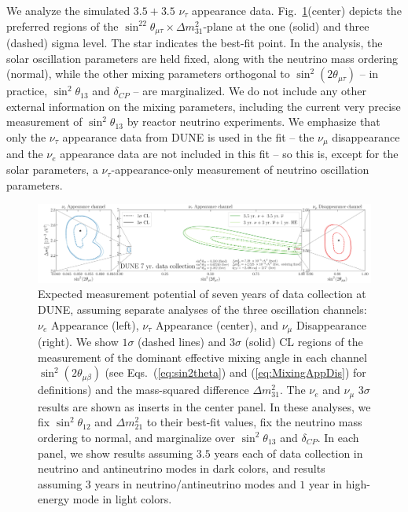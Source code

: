 \documentclass[aps,prd,onecolumn,nofootinbib,superscriptaddress, 11pt]{revtex4}
\begin{document}
We analyze the simulated $3.5+3.5$ $\nu_{\tau}$ appearance data. Fig.~\ref{fig:two_param}(center) depicts the preferred regions of the  $\sin^22\theta_{\mu\tau}\times \Delta m^2_{31}$-plane at the one (solid) and three (dashed) sigma level. The star indicates the best-fit point. In the analysis, the solar oscillation parameters are held fixed, along with the neutrino mass ordering (normal), while the other mixing parameters orthogonal to $\sin^2(2\theta_{\mu\tau})$ -- in practice, $\sin^2\theta_{13}$ and $\delta_{CP}$ -- are marginalized. We do not include any other external information on the mixing parameters, including the current very precise measurement of $\sin^2\theta_{13}$ by reactor neutrino experiments. We emphasize that only the $\nu_{\tau}$ appearance data from DUNE is used in the fit -- the $\nu_{\mu}$ disappearance and the $\nu_e$ appearance data are not included in this fit -- so this is, except for the solar parameters, a $\nu_\tau$-appearance-only measurement of neutrino oscillation parameters. 
\begin{figure}[ht]
\centerline{
\includegraphics[width=1\textwidth]{EffectiveAngle_Measurements.pdf}}
\caption{Expected measurement potential of seven years of data collection at DUNE, assuming separate analyses of the three oscillation channels: $\nu_e$ Appearance (left), $\nu_\tau$ Appearance (center), and $\nu_\mu$ Disappearance (right). We show $1\sigma$ (dashed lines) and $3\sigma$ (solid) CL regions of the measurement of the dominant effective mixing angle in each channel $\sin^2 (2\theta_{\mu \beta})$ (see Eqs.~(\ref{eq:sin2theta}) and (\ref{eq:MixingAppDis}) for definitions) and the mass-squared difference $\Delta m_{31}^2$. The $\nu_e$ and $\nu_\mu$ $3\sigma$ results are shown as inserts in the center panel. In these analyses, we fix $\sin^2\theta_{12}$ and $\Delta m_{21}^2$ to their best-fit values, fix the neutrino mass ordering to normal, and marginalize over $\sin^2\theta_{13}$ and $\delta_{CP}$. In each panel, we show results assuming $3.5$ years each of data collection in neutrino and antineutrino modes in dark colors, and results assuming $3$ years in neutrino/antineutrino modes and $1$ year in high-energy mode in light colors.}
\label{fig:two_param}
\end{figure}
\end{document}
